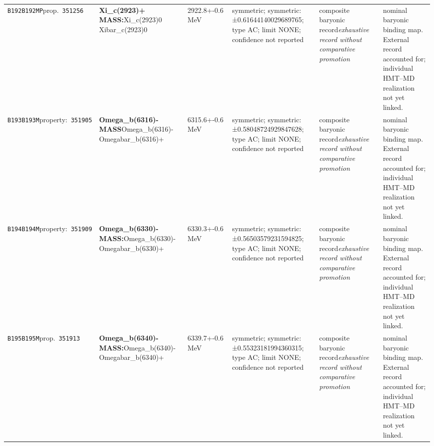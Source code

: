 \begin{landscape}
\begin{longtable}{L{1.85cm}L{4.45cm}L{2.35cm}L{4.05cm}L{3.35cm}L{7.15cm}}
\texttt{B192}\newline \texttt{B192MP}\newline prop.\ \texttt{351256} & \textbf{Xi\_\allowbreak{}c(2923)+ MASS:}\newline Xi\_\allowbreak{}c(2923)0 \textbar{}\allowbreak{} Xibar\_\allowbreak{}c(2923)0 & 2922.8+-0.6\,MeV & symmetric; symmetric: ±0.61644140029689765; type AC; limit NONE; confidence not reported & composite baryonic record\newline \emph{exhaustive record without comparative promotion} & nominal baryonic binding map. External record accounted for; individual HMT--MD realization not yet linked. \\
\texttt{B193}\newline \texttt{B193M}\newline property:\ \texttt{351905} & \textbf{Omega\_\allowbreak{}b(6316)- MASS}\newline Omega\_\allowbreak{}b(6316)- \textbar{}\allowbreak{} Omegabar\_\allowbreak{}b(6316)+ & 6315.6+-0.6\,MeV & symmetric; symmetric: ±0.58048724929847628; type AC; limit NONE; confidence not reported & composite baryonic record\newline \emph{exhaustive record without comparative promotion} & nominal baryonic binding map. External record accounted for; individual HMT--MD realization not yet linked. \\
\texttt{B194}\newline \texttt{B194M}\newline property:\ \texttt{351909} & \textbf{Omega\_\allowbreak{}b(6330)- MASS:}\newline Omega\_\allowbreak{}b(6330)- \textbar{}\allowbreak{} Omegabar\_\allowbreak{}b(6330)+ & 6330.3+-0.6\,MeV & symmetric; symmetric: ±0.56503579231594825; type AC; limit NONE; confidence not reported & composite baryonic record\newline \emph{exhaustive record without comparative promotion} & nominal baryonic binding map. External record accounted for; individual HMT--MD realization not yet linked. \\
\texttt{B195}\newline \texttt{B195M}\newline prop.\ \texttt{351913} & \textbf{Omega\_\allowbreak{}b(6340)- MASS:}\newline Omega\_\allowbreak{}b(6340)- \textbar{}\allowbreak{} Omegabar\_\allowbreak{}b(6340)+ & 6339.7+-0.6\,MeV & symmetric; symmetric: ±0.55323181994360315; type AC; limit NONE; confidence not reported & composite baryonic record\newline \emph{exhaustive record without comparative promotion} & nominal baryonic binding map. External record accounted for; individual HMT--MD realization not yet linked. \\

\end{longtable}
\end{landscape}
